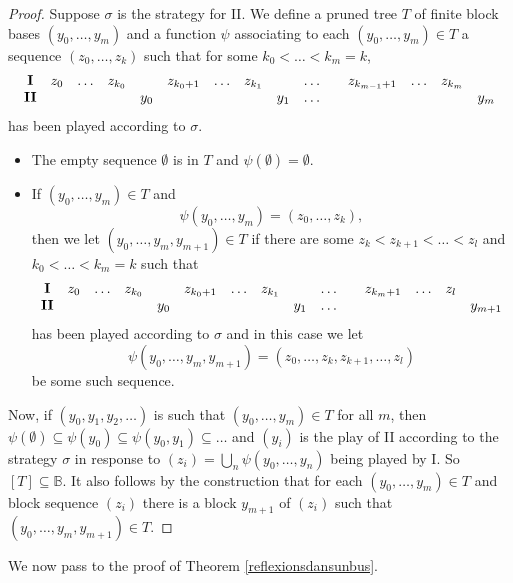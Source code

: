 \documentclass[10pt]{amsart}
\numberwithin{equation}{section}
\begin{document}
\begin{proof}
Suppose $\sigma$ is the strategy for II. We
define a pruned tree $T$ of  finite block bases
$(y_0,\ldots,y_m)$ and a function $\psi$ associating to each
$(y_0,\ldots,y_m)\in T$ a sequence $(z_0,\ldots,z_k)$ such that for some $k_0<\ldots<k_m=k$,
$$
\begin{array}{ccccccccccccccc}
 {\bf I} &z_0&\ldots&z_{k_0}&       &   z_{k_0+1}&\ldots&z_{k_1}&       &\ldots& & z_{k_{m-1}+1} & \ldots&
z_{k_m}&\\
 {\bf II}&      &         &              &y_0&                     &          &             &y_1&\ldots&  &&  && y_{m}\\
\end{array}
$$
has been played according to $\sigma$.

\begin{itemize}
  \item The empty sequence ${\emptyset}$ is in $T$ and $\psi({\emptyset})={\emptyset}$.
  \item If $(y_0,\ldots,y_m)\in T$ and
  $$
  \psi(y_0,\ldots,y_m)=(z_0,\ldots,z_k),
  $$
  then we let
  $(y_0,\ldots,y_m,y_{m+1})\in T$ if there are some $z_k<z_{k+1}<\ldots<z_l$ and $k_0<\ldots<k_m=k$ such that
$$
\begin{array}{cccccccccccccccccc}
 {\bf I} &z_0&\ldots&z_{k_0}&       &   z_{k_0+1}&\ldots&z_{k_1}&       &\ldots& & z_{k_m+1} & \ldots&
z_{l}&\\
 {\bf II}&      &         &              &y_0&                     &          &             &y_1&\ldots&  &&  && y_{m+1}\\
\end{array}
$$
has been played according to $\sigma$   and in this case we let
  $$
  \psi(y_0,\ldots,y_m,y_{m+1})=(z_0,\ldots,z_k,z_{k+1},\ldots,z_l)
  $$
  be some such sequence.
\end{itemize}
Now, if $(y_0,y_1,y_2,\ldots)$ is such that $(y_0,\ldots,y_m)\in T$ for all
$m$, then $\psi({\emptyset})\subseteq \psi(y_0)\subseteq \psi(y_0,y_1)\subseteq
\ldots$ and $(y_i)$ is the play of II according to the strategy $\sigma$ in
response to $(z_i)=\bigcup_n\psi(y_0,\ldots,y_n)$ being played by I. So
$[T]\subseteq {\mathbb B}$. It  also follows by the construction that for each
$(y_0,\ldots,y_m)\in T$ and block sequence $(z_i)$ there is a block $y_{m+1}$
of $(z_i)$ such that $(y_0,\ldots,y_m,y_{m+1})\in T$.
\end{proof}

We now pass to the proof of Theorem \ref{reflexionsdansunbus}.
\end{document}
